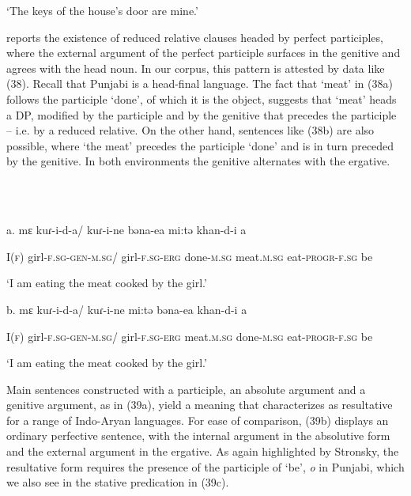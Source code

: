 \documentclass[output=paper]{langsci/langscibook}
\begin{document}
\begin{styleSfondomedioiColorexi}
  ‘The keys of the house’s door are mine.’
\end{styleSfondomedioiColorexi}

\begin{styleSfondomedioiColorexi}
\citet[295]{Payne1995} reports the existence of reduced relative clauses headed by perfect participles, where the external argument of the perfect participle surfaces in the genitive and agrees with the head noun. In our corpus, this pattern is attested by data like (38). Recall that Punjabi is a head-final language. The fact that ‘meat’ in (38a) follows the participle ‘done’, of which it is the object, suggests that ‘meat’ heads a DP, modified by the participle and by the genitive that precedes the participle – i.e. by a reduced relative. On the other hand, sentences like (38b) are also possible, where ‘the meat’ precedes the participle ‘done’ and is in turn preceded by the genitive. In both environments the genitive alternates with the ergative.
\end{styleSfondomedioiColorexi}

\ea%
    \label{ex:key:38}
    \gll\\
        \\
    \glt
    \z

          a.  mɛ  kuɾ-i-d-a/  kuɾ-i-ne  bəna-ea      mi:tə      khan-d-i   a

    I(\textsc{f})  girl-\textsc{f.sg-gen-m.sg}/  girl-\textsc{f.sg-erg}  done-\textsc{m.sg}  meat.\textsc{m.sg}  eat-\textsc{progr-f.sg}  be

    ‘I am eating the meat cooked by the girl.’

b.  mɛ  kuɾ-i-d-a/   kuɾ-i-ne   mi:tə  bəna-ea     khan-d-i   a

  I(\textsc{f})  girl-\textsc{f.sg-gen-m.sg}/  girl-\textsc{f.sg-erg}   meat.\textsc{m.sg}  done-\textsc{m.sg}   eat-\textsc{progr-f.sg}   be

  ‘I am eating the meat cooked by the girl.’

Main sentences constructed with a participle, an absolute argument and a genitive argument, as in (39a), yield a meaning that \citet{Stronsky2013} characterizes as resultative for a range of Indo-Aryan languages. For ease of comparison, (39b) displays an ordinary perfective sentence, with the internal argument in the absolutive form and the external argument in the ergative. As again highlighted by Stronsky, the resultative form requires the presence of the participle of ‘be’, \textit{o} in Punjabi, which we also see in the stative predication in (39c).
\end{document}
